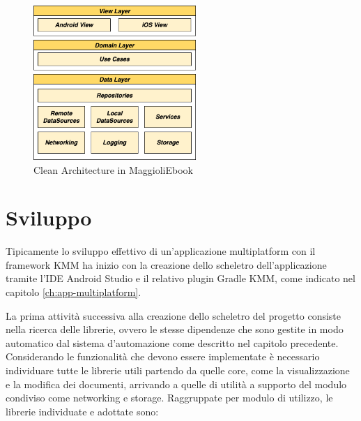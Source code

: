 \begin{figure}[H]
    \centering
    \includegraphics[width=0.55\textwidth]{img/clean-architecture.png}
    \caption{Clean Architecture in MaggioliEbook}
    \label{clean-arch-kmm-fig}
\end{figure}

\section{Sviluppo}
Tipicamente lo sviluppo effettivo di un'applicazione multiplatform con il framework KMM ha inizio con la creazione dello scheletro dell'applicazione tramite l'IDE Android Studio e il relativo plugin Gradle KMM, 
come indicato nel capitolo \ref{ch:app-multiplatform}.

La prima attività successiva alla creazione dello scheletro del progetto consiste nella ricerca delle librerie, 
ovvero le stesse dipendenze che sono gestite in modo automatico dal sistema d'automazione come descritto nel capitolo precedente. 
Considerando le funzionalità che devono essere implementate è necessario individuare tutte le librerie utili partendo da quelle core, 
come la visualizzazione e la modifica dei documenti, 
arrivando a quelle di utilità a supporto del modulo condiviso come networking e storage. 
Raggruppate per modulo di utilizzo, 
le librerie individuate e adottate sono:

